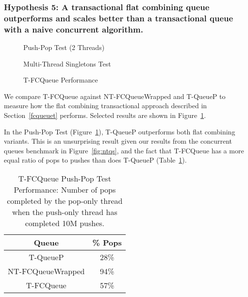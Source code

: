 \subsubsection{Hypothesis 5: A transactional flat combining queue outperforms and scales better than a transactional queue with a naive concurrent algorithm.}
\label{eval:hypo5}

\begin{figure}[H]
    \centering
	\begin{minipage}{0.75\textwidth}
        \caption*{Push-Pop Test (2 Threads)}
        \vspace{12pt}
	\end{minipage}
   	\begin{minipage}{0.75\textwidth}
        \caption*{Multi-Thread Singletons Test}
	\end{minipage}
        \caption{T-FCQueue Performance}
    \label{fig:tqs}
\end{figure}

We compare T-FCQueue against NT-FCQueueWrapped and T-QueueP to measure how the flat combining transactional approach described in Section~\ref{fcqueuet} performs. Selected results are shown in Figure~\ref{fig:tqs}.

In the Push-Pop Test (Figure~\ref{fig:tqs}), T-QueueP outperforms both flat combining variants. This is an unsurprising result given our results from the concurrent queues benchmark in Figure~\ref{fig:ntqs}, and the fact that T-FCQueue has a more equal ratio of pops to pushes than does T-QueueP (Table~\ref{tab:tfc_pop_push_ratio}). 

\begin{table}[t]
        \centering
    \begin{tabular}{|cc|}
        \hline
        Queue & \% Pops\\
        \hline
            T-QueueP & 28\%\\
            NT-FCQueueWrapped & 94\%\\
            T-FCQueue & 57\%\\
        \hline
    \end{tabular}

    \caption{T-FCQueue Push-Pop Test Performance: Number of pops completed by the pop-only thread when the push-only thread has completed 10M pushes.}
    \label{tab:tfc_pop_push_ratio}
\end{table}

